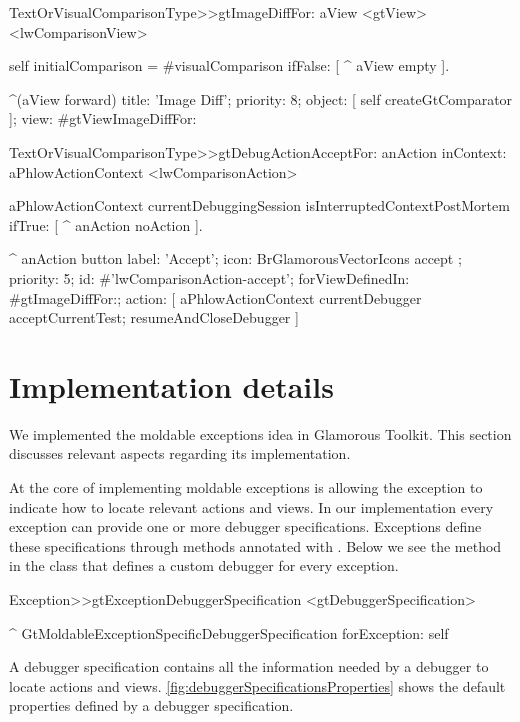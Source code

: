 \documentclass[sigplan,anonymous,review,10pt]{acmart}
\begin{document}
\begin{code}
TextOrVisualComparisonType>>gtImageDiffFor: aView
	<gtView>
	<lwComparisonView>
	
	self initialComparison = #visualComparison 
		ifFalse: [ ^ aView empty  ].
	
	^(aView forward)
		title: 'Image Diff';
		priority: 8;
		object: [ self createGtComparator ];
		view: #gtViewImageDiffFor:
\end{code}

\begin{code}
TextOrVisualComparisonType>>gtDebugActionAcceptFor: anAction inContext: aPhlowActionContext
	<lwComparisonAction>
	
	aPhlowActionContext currentDebuggingSession 
		isInterruptedContextPostMortem
			ifTrue: [ ^ anAction noAction ].
	
	^ anAction button
		label: 'Accept';
		icon: BrGlamorousVectorIcons accept ;
		priority: 5;
		id: #'lwComparisonAction-accept';
		forViewDefinedIn: #gtImageDiffFor:;
		action: [ 
			aPhlowActionContext currentDebugger 
				acceptCurrentTest;
				resumeAndCloseDebugger ]
\end{code}

\section{Implementation details}\label{sec:directions}
We implemented the moldable exceptions idea in Glamorous Toolkit. This section discusses relevant aspects regarding its implementation.

At the core of implementing moldable exceptions is allowing the exception to indicate how to locate relevant actions and views.
In our implementation every exception can provide one or more debugger specifications. 
Exceptions define these specifications through methods annotated with . 
Below we see the method in the  class that defines a custom debugger for every exception.

\begin{code}
Exception>>gtExceptionDebuggerSpecification
	<gtDebuggerSpecification>
	
	^ GtMoldableExceptionSpecificDebuggerSpecification 
		forException: self
\end{code}

A debugger specification contains all the information needed by a debugger to locate actions and views. 
\autoref{fig:debuggerSpecificationsProperties} shows the default properties defined by a debugger specification.
\end{document}
